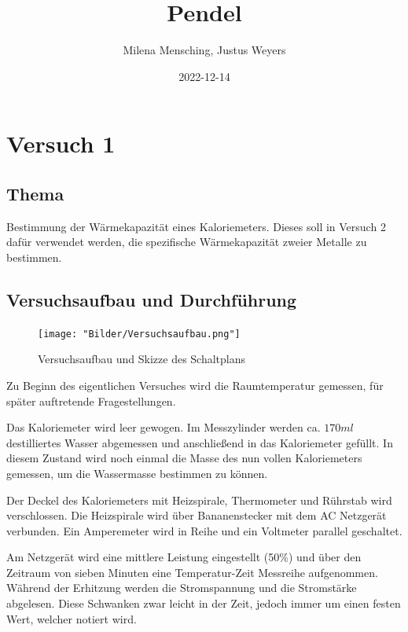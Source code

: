 \documentclass[
  9pt,
]{article}
\title{Pendel}
\author{Milena Mensching, Justus Weyers}
\date{2022-12-14}
\begin{document}
\maketitle

\hypertarget{versuch-1}{%
\section{Versuch 1}\label{versuch-1}}

\hypertarget{thema}{%
\subsection{Thema}\label{thema}}

Bestimmung der Wärmekapazität eines Kaloriemeters. Dieses soll in
Versuch 2 dafür verwendet werden, die spezifische Wärmekapazität zweier
Metalle zu bestimmen.

\hypertarget{versuchsaufbau-und-durchfuxfchrung}{%
\subsection{Versuchsaufbau und
Durchführung}\label{versuchsaufbau-und-durchfuxfchrung}}

\begin{figure}
\centering
\texttt{[image: "Bilder/Versuchsaufbau.png"]}
\caption{Versuchsaufbau und Skizze des Schaltplans}
\end{figure}

Zu Beginn des eigentlichen Versuches wird die Raumtemperatur gemessen,
für später auftretende Fragestellungen.

Das Kaloriemeter wird leer gewogen. Im Messzylinder werden ca. \(170ml\)
destilliertes Wasser abgemessen und anschließend in das Kaloriemeter
gefüllt. In diesem Zustand wird noch einmal die Masse des nun vollen
Kaloriemeters gemessen, um die Wassermasse bestimmen zu können.

Der Deckel des Kaloriemeters mit Heizspirale, Thermometer und Rührstab
wird verschlossen. Die Heizspirale wird über Bananenstecker mit dem AC
Netzgerät verbunden. Ein Amperemeter wird in Reihe und ein Voltmeter
parallel geschaltet.

Am Netzgerät wird eine mittlere Leistung eingestellt (50\%) und über den
Zeitraum von sieben Minuten eine Temperatur-Zeit Messreihe aufgenommen.
Während der Erhitzung werden die Stromspannung und die Stromstärke
abgelesen. Diese Schwanken zwar leicht in der Zeit, jedoch immer um
einen festen Wert, welcher notiert wird.
\end{document}
